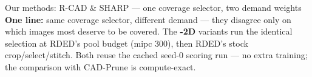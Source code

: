 \documentclass[aspectratio=169]{beamer}
\begin{document}
\begin{frame}{Our methods: R-CAD \& SHARP --- one coverage selector, two demand weights}
    \vspace{0.05cm}
    {\tiny \textbf{One line:} same coverage selector, different demand --- they disagree only on which
    images most deserve to be covered. The \textbf{-2D} variants run the identical selection at RDED's pool
    budget (mipc 300), then RDED's stock crop/select/stitch. Both reuse the cached seed-0 scoring run ---
    no extra training; the comparison with CAD-Prune is compute-exact.}

\end{frame}
\end{document}

